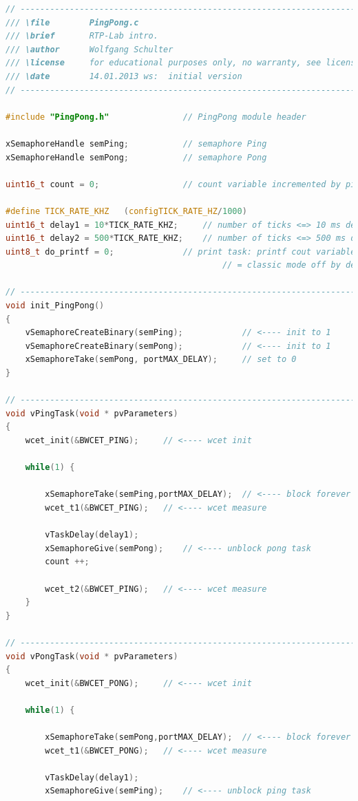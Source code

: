 \begin{lstlisting}[style=mystyle, language=c]
// ----------------------------------------------------------------------------
/// \file		 PingPong.c
/// \brief		 RTP-Lab intro.
/// \author		 Wolfgang Schulter 
/// \license	 for educational purposes only, no warranty, see license.txt
/// \date		 14.01.2013 ws:  initial version
// ----------------------------------------------------------------------------

#include "PingPong.h"  				// PingPong module header

xSemaphoreHandle semPing;			// semaphore Ping
xSemaphoreHandle semPong;			// semaphore Pong

uint16_t count = 0;					// count variable incremented by ping

#define TICK_RATE_KHZ	(configTICK_RATE_HZ/1000)
uint16_t delay1 = 10*TICK_RATE_KHZ;		// number of ticks <=> 10 ms delay as default
uint16_t delay2 = 500*TICK_RATE_KHZ;	// number of ticks <=> 500 ms delay as default
uint8_t do_printf = 0;				// print task: printf cout variable to stdout, if 1
											// = classic mode off by default (we have the GLCD)

// ----------------------------------------------------------------------------
void init_PingPong()
{
	vSemaphoreCreateBinary(semPing);			// <---- init to 1
	vSemaphoreCreateBinary(semPong);			// <---- init to 1
	xSemaphoreTake(semPong, portMAX_DELAY);		// set to 0
}

// ----------------------------------------------------------------------------
void vPingTask(void * pvParameters)
{
	wcet_init(&BWCET_PING);		// <---- wcet init

	while(1) {

		xSemaphoreTake(semPing,portMAX_DELAY);	// <---- block forever until ...
		wcet_t1(&BWCET_PING);	// <---- wcet measure

		vTaskDelay(delay1);
		xSemaphoreGive(semPong);	// <---- unblock pong task
		count ++;

		wcet_t2(&BWCET_PING);	// <---- wcet measure
	}
}

// ----------------------------------------------------------------------------
void vPongTask(void * pvParameters)
{
	wcet_init(&BWCET_PONG);		// <---- wcet init

	while(1) {

		xSemaphoreTake(semPong,portMAX_DELAY);	// <---- block forever until ...
		wcet_t1(&BWCET_PONG);	// <---- wcet measure

		vTaskDelay(delay1);
		xSemaphoreGive(semPing);	// <---- unblock ping task


\end{lstlisting}
